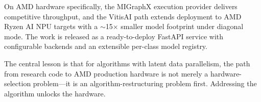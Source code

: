 \documentclass[blind]{gtac}
\begin{document}
On AMD hardware specifically, the MIGraphX execution provider delivers
competitive throughput, and the VitisAI path extends deployment to AMD Ryzen AI
NPU targets with a $\sim$15$\times$ smaller model footprint under diagonal mode.
The work is released as a ready-to-deploy FastAPI service with configurable
backends and an extensible per-class model registry.

The central lesson is that for algorithms with latent data parallelism, the path
from research code to AMD production hardware is not merely a
hardware-selection problem---it is an algorithm-restructuring problem first.
Addressing the algorithm unlocks the hardware.

\begingroup
\let\itshape\upshape


\endgroup
\end{document}
